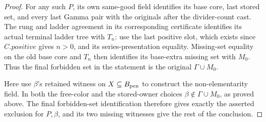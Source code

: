 \begin{proof}
For any such $P$, its own same-good field identifies its base core,
last stored set, and every last Gamma pair with the originals after the
divider-count cast. The rung and ladder agreement in its corresponding
certificate identifies its actual terminal ladder tree with $T_n$:
use the last positive slot, which exists since $C.\mathit{positive}$
gives $n>0$, and its series-presentation equality. Missing-set equality
on the old base core and $T_n$ then identifies its base-extra missing
set with $M_0$. Thus the final forbidden set in the statement is the
original $\Gamma\cup M_0$.

Here use $\beta$'s retained witness on $X\subseteq B_{\rm pen}$ to
construct the non-elementarity field. In both the free-color and the
stored-owner choices $\beta\notin\Gamma\cup M_0$, as proved above.
The final forbidden-set identification therefore gives exactly the
asserted exclusion for $P,\beta$, and its two missing witnesses
give the rest of the conclusion.
\end{proof}
